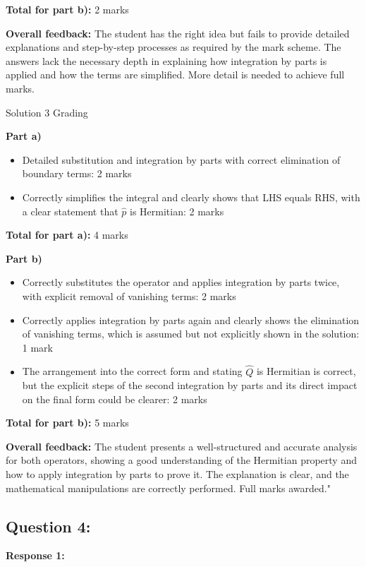 \documentclass[a4paper,11pt]{article}
\begin{document}
\textbf{Total for part b):} 2 marks

\textbf{Overall feedback:} The student has the right idea but fails to provide detailed explanations and step-by-step processes as required by the mark scheme. The answers lack the necessary depth in explaining how integration by parts is applied and how the terms are simplified. More detail is needed to achieve full marks.

Solution 3 Grading

\textbf{Part a)}
\begin{itemize}
    \item Detailed substitution and integration by parts with correct elimination of boundary terms: 2 marks
    \item Correctly simplifies the integral and clearly shows that LHS equals RHS, with a clear statement that \( \hat{p} \) is Hermitian: 2 marks
\end{itemize}

\textbf{Total for part a):} 4 marks

\textbf{Part b)}
\begin{itemize}
    \item Correctly substitutes the operator and applies integration by parts twice, with explicit removal of vanishing terms: 2 marks
    \item Correctly applies integration by parts again and clearly shows the elimination of vanishing terms, which is assumed but not explicitly shown in the solution: 1 mark
    \item The arrangement into the correct form and stating \(\hat{Q}\) is Hermitian is correct, but the explicit steps of the second integration by parts and its direct impact on the final form could be clearer: 2 marks
\end{itemize}

\textbf{Total for part b):} 5 marks

\textbf{Overall feedback:} The student presents a well-structured and accurate analysis for both operators, showing a good understanding of the Hermitian property and how to apply integration by parts to prove it. The explanation is clear, and the mathematical manipulations are correctly performed. Full marks awarded."

\subsection*{Question 4:}

\textbf{Response 1:}
\end{document}
